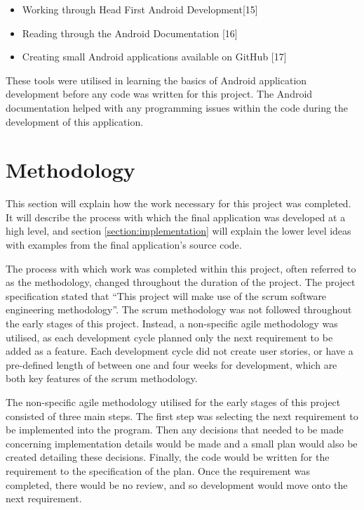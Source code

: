\documentclass{article}
\begin{document}
\begin{itemize}
	\item Working through Head First Android Development[15]
	\item Reading through the Android Documentation [16]
	\item Creating small Android applications available on GitHub [17]
\end{itemize}

These tools were utilised in learning the basics of Android application development before any code was written for this project. The Android documentation helped with any programming issues within the code during the development of this application. 

\section{Methodology}
\label{section:methodology}

This section will explain how the work necessary for this project was completed. It will describe the process with which the final application was developed at a high level, and section \ref{section:implementation} will explain the lower level ideas with examples from the final application's source code. \par

The process with which work was completed within this project, often referred to as the methodology, changed throughout the duration of the project. The project specification stated that ``This project will make use of the scrum software engineering methodology''. The scrum methodology was not followed throughout the early stages of this project. Instead, a non-specific agile methodology was utilised, as each development cycle planned only the next requirement to be added as a feature. Each development cycle did not create user stories, or have a pre-defined length of between one and four weeks for development, which are both key features of the scrum methodology. \par

The non-specific agile methodology utilised for the early stages of this project consisted of three main steps. The first step was selecting the next requirement to be implemented into the program. Then any decisions that needed to be made concerning implementation details would be made and a small plan would also be created detailing these decisions. Finally, the code would be written for the requirement to the specification of the plan. Once the requirement was completed, there would be no review, and so development would move onto the next requirement. \par
\end{document}
